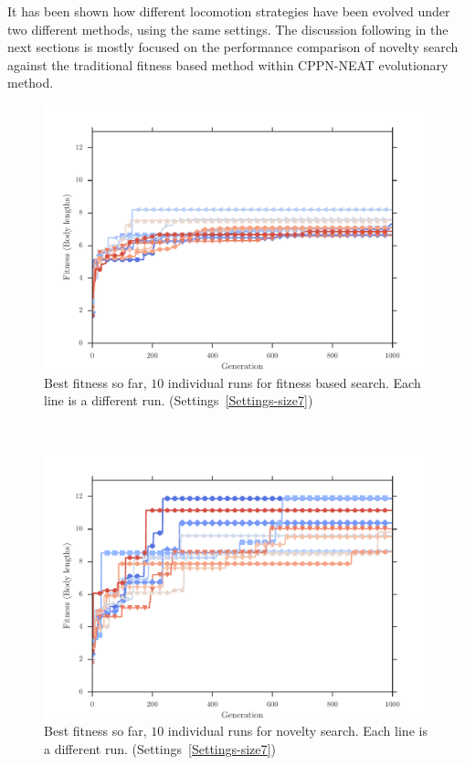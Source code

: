 It has been shown how different locomotion strategies have been evolved under two different methods, using the same settings. The discussion following in the next sections is mostly focused on the performance comparison of novelty search against the traditional fitness based method within CPPN-NEAT evolutionary method.





\clearpage


\begin{figure}[ht!]
\centering
\includegraphics[width=1.0\textwidth]{../Figures/Results/indRunnAvgSize7Fitness.pdf}
\caption{Best fitness so far, $10$ individual runs for fitness based search. Each line is a different run. (Settings~\ref{Settings-size7})}
\label{fig:indRunsAvgSize10Fitness}
\end{figure}
~
\begin{figure}[ht!]
\centering
\includegraphics[width=1.0\textwidth]{../Figures/Results/indRunnAvgSize7Novelty.pdf}
\caption{Best fitness so far, $10$ individual runs for novelty search. Each line is a different run. (Settings~\ref{Settings-size7})}
\label{fig:indRunnAvgSize10Novelty}
\end{figure}

